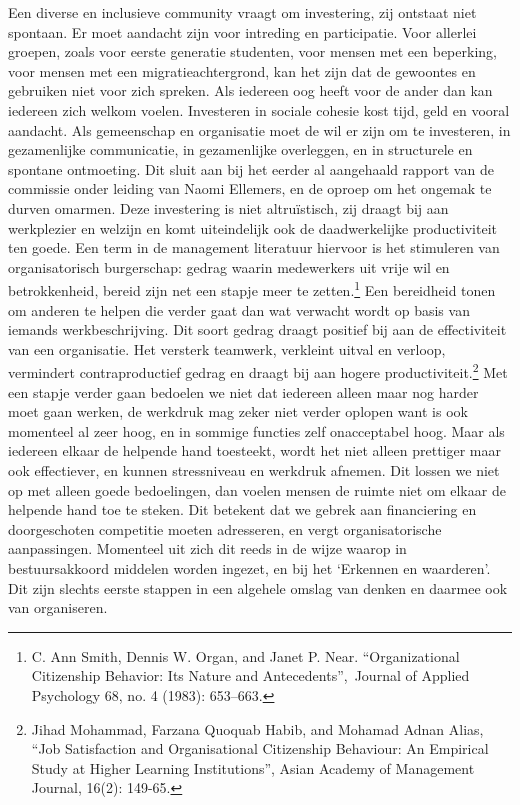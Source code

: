 \documentclass[empirical, authordate, ]{new-jote-article}
\begin{document}
	Een diverse en inclusieve community vraagt om investering, zij ontstaat niet spontaan. Er moet aandacht zijn voor intreding en participatie. Voor allerlei groepen, zoals voor eerste generatie studenten, voor mensen met een beperking, voor mensen met een migratieachtergrond, kan het zijn dat de gewoontes en gebruiken niet voor zich spreken. Als iedereen oog heeft voor de ander dan kan iedereen zich welkom voelen. Investeren in sociale cohesie kost tijd, geld en vooral aandacht. Als gemeenschap en organisatie moet de wil er zijn om te investeren, in gezamenlijke communicatie, in gezamenlijke overleggen, en in structurele en spontane ontmoeting. Dit sluit aan bij het eerder al aangehaald rapport van de commissie onder leiding van Naomi Ellemers, en de oproep om het ongemak te durven omarmen. Deze investering is niet altruïstisch, zij draagt bij aan werkplezier en welzijn en komt uiteindelijk ook de daadwerkelijke productiviteit ten goede. Een term in de management literatuur hiervoor is het stimuleren van organisatorisch burgerschap: gedrag waarin medewerkers uit vrije wil en betrokkenheid, bereid zijn net een stapje meer te zetten.\footnote{C. Ann Smith, Dennis W. Organ, and Janet P. Near. “Organizational Citizenship Behavior: Its Nature and Antecedents”, Journal of Applied Psychology 68, no. 4 (1983): 653--663.} Een bereidheid tonen om anderen te helpen die verder gaat dan wat verwacht wordt op basis van iemands werkbeschrijving. Dit soort gedrag draagt positief bij aan de effectiviteit van een organisatie. Het versterk teamwerk, verkleint uitval en verloop, vermindert contraproductief gedrag en draagt bij aan hogere productiviteit.\footnote{Jihad Mohammad, Farzana Quoquab Habib, and Mohamad Adnan Alias, “Job Satisfaction and Organisational Citizenship Behaviour: An Empirical Study at Higher Learning Institutions”, Asian Academy of Management Journal, 16(2): 149-65.} Met een stapje verder gaan bedoelen we niet dat iedereen alleen maar nog harder moet gaan werken, de werkdruk mag zeker niet verder oplopen want is ook momenteel al zeer hoog, en in sommige functies zelf onacceptabel hoog. Maar als iedereen elkaar de helpende hand toesteekt, wordt het niet alleen prettiger maar ook effectiever, en kunnen stressniveau en werkdruk afnemen. Dit lossen we niet op met alleen goede bedoelingen, dan voelen mensen de ruimte niet om elkaar de helpende hand toe te steken. Dit betekent dat we gebrek aan financiering en doorgeschoten competitie moeten adresseren, en vergt organisatorische aanpassingen. Momenteel uit zich dit reeds in de wijze waarop in bestuursakkoord middelen worden ingezet, en bij het ‘Erkennen en waarderen'. Dit zijn slechts eerste stappen in een algehele omslag van denken en daarmee ook van organiseren.
\end{document}
